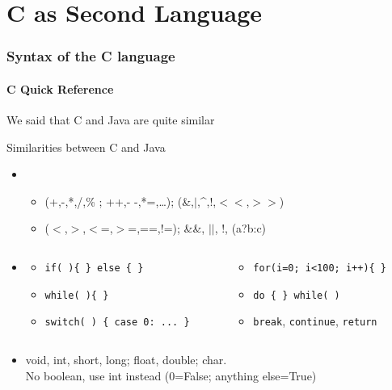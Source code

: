 \part{C as Second Language}\toc
\section{Syntax of the C language}
\subsection{C Quick Reference}
\begin{Coupe}
 
\begin{frame}{We said that C and Java are quite similar}
  \begin{block}{Similarities between C and Java}
    \begin{itemize}
    \item {}
      \begin{itemize}
      \item {} (+,-,*,/,\% ;  ++,- -,*=,\ldots);
         (\&,$|$,\^{},!,$<<$,$>>$)
      \item {} ($<$,$>$,$<$=,$>$=,==,!=);
       \&\&, $||$, !, (a?b:c)
      \end{itemize}
    \item {}\vspace{-.5\baselineskip}
      \begin{columns}
        \begin{column}{.5\linewidth}
          \begin{itemize}
          \item \texttt{if( )\{ \} else \{ \}}
          \item \texttt{while( )\{ \}}
          \item \texttt{switch( ) \{ case 0: ... \}}
          \end{itemize}
        \end{column}
        \begin{column}{.45\linewidth}
          \begin{itemize}
          \item \texttt{for(i=0; i<100; i++)\{ \}}
          \item \texttt{do \{ \} while( )}
          \item \texttt{break}, \texttt{continue}, \texttt{return}
          \end{itemize}
        \end{column}
      \end{columns}\smallskip
    \item {} void, int, short, long; float,
      double; char.\\ {\small No boolean, use int instead  (0=False; anything
        else=True)}


\end{itemize}
\end{block}
\end{frame}
\end{Coupe}
